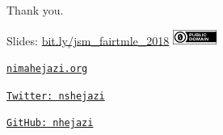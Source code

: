 \documentclass[12pt,t]{beamer}
\begin{document}

\begin{frame}[c]{Thank you.}

\Large
Slides: \href{https://bit.ly/jsm_fairtmle_2018}{bit.ly/jsm\_fairtmle\_2018}
\quad \includegraphics[height=5mm]{Figs/cc-zero.png}

\vspace{2mm}
\href{http://nimahejazi.org}{\tt nimahejazi.org}

\vspace{2mm}
\href{https://twitter.com/nshejazi}{\tt Twitter: nshejazi}

\vspace{2mm}
\href{https://github.com/nhejazi}{\tt GitHub: nhejazi}


\end{frame}

\end{document}
